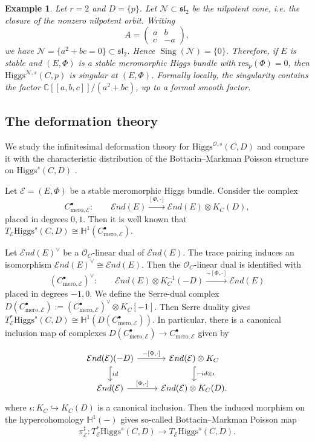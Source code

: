 \documentclass[11pt]{amsart}
\theoremstyle{plain}
\newtheorem{example}[theorem]{Example}
\theoremstyle{definition}
\theoremstyle{remark}
\newcommand{\C}{\mathbb C}
\newcommand{\End}{\mathcal E nd}
\newcommand{\HH}{\mathbb H}
\newcommand{\cO}{\mathcal O}
\newcommand{\Higgs}{\mathrm{Higgs}}
\def\C{\mathbb{C}}
\def\res{\mathrm{res}}
\begin{document}
 
\begin{example}
	Let $r=2$ and $D=\{p\}$. Let $\mathcal N\subset\mathfrak{sl}_2$ be the nilpotent cone, i.e. the closure of the nonzero nilpotent orbit. Writing
	\[
	A=
	\begin{pmatrix}
	a&b\\
	c&-a
	\end{pmatrix},
	\]
	we have $\mathcal N=\{a^2+bc=0\}\subset\mathfrak{sl}_2$. Hence
	$\operatorname{Sing}(\mathcal N)=\{0\}$. Therefore, if $E$ is stable and $(E,\Phi)$ is a stable meromorphic Higgs bundle with $\res_p(\Phi)=0$, then $\Higgs^{\mathcal N,s}(C,p)$ is singular at $(E,\Phi)$. Formally locally, the singularity contains the factor $
	\C[[a,b,c]]/(a^2+bc)$, up to a formal smooth factor.
\end{example}

\subsection{The deformation theory}\label{sec:mero deform}

We study the infinitesimal deformation theory for $\Higgs^{\cO,s}(C,D)$ and compare it with the characteristic distribution of the Bottacin--Markman Poisson structure on $\Higgs^s(C,D)$ \cite{markmanspectral,Bottacin1995symplectic}.

Let $\mathcal E=(E,\Phi)$ be a stable meromorphic Higgs bundle. Consider the complex
\[
C_{\text{mero},\mathcal E}^\bullet:
\qquad
\End(E)\xrightarrow{[\Phi,\cdot]}\End(E)\otimes K_C(D),
\]
placed in degrees $0,1$. Then it is well known that $T_{\mathcal E}\Higgs^s(C,D)\cong\HH^1(C_{\mathrm{mero},\mathcal E}^\bullet)$. 

Let $\End(E)^\vee$ be a $\cO_C$-linear dual of $\End(E)$. The trace pairing induces an isomorphism $\End(E)^\vee \cong \End(E)$. Then the $\cO_C$-linear dual is identified with 
\[
(C_{\text{mero},\mathcal E}^\bullet)^\vee:
\qquad
\End(E)\otimes K_C^{-1}(-D)\xrightarrow{-[\Phi,\cdot]}\End(E)
\]
placed in degrees $-1,0$. We define the Serre-dual complex $D(C^\bullet_{\text{mero},\mathcal{E}}):=(C_{\text{mero},\mathcal E}^\bullet)^\vee \otimes K_C[-1]$. Then Serre duality gives $T_{\mathcal E}^*\Higgs^s(C,D)\cong\HH^1(D(C_{\text{mero},\mathcal E}^\bullet))$. In particular, there is a canonical inclusion map of complexes $D(C_{\text{mero},\mathcal E}^\bullet) \to C_{\text{mero},\mathcal E}^\bullet$ given by 

\[\begin{tikzcd}
    \End(\mathcal E)(-D)
    \arrow[r, "{-[\Phi,\cdot]}"]
    \arrow[d, hook, "id"]
    &
    \End(\mathcal E)\otimes K_C
    \arrow[d, hook, "-id \otimes \iota"]
    \\
    \End(\mathcal E)
    \arrow[r, "{[\Phi,\cdot]}"]
    &
    \End(\mathcal E)\otimes K_C(D).
\end{tikzcd}\]
where $\iota:K_C \hookrightarrow K_C(D)$ is a canonical inclusion. Then the induced morphism on the hypercohomology $\HH^1(-)$ gives so-called Bottacin--Markman Poisson map 
\[\pi_{\mathcal E}^\sharp:T_{\mathcal E}^*\Higgs^s(C,D)\to T_{\mathcal E}\Higgs^s(C,D).\]
\end{document}
